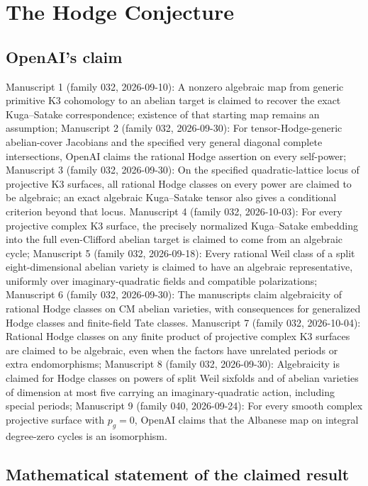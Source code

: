 \documentclass[11pt]{article}
\begin{document}
\section*{The Hodge Conjecture}

\subsection{OpenAI's claim}
Manuscript 1 (family 032, 2026-09-10): A nonzero algebraic map from generic primitive K3 cohomology to an abelian target is claimed to recover the exact Kuga--Satake correspondence; existence of that starting map remains an assumption; Manuscript 2 (family 032, 2026-09-30): For tensor-Hodge-generic abelian-cover Jacobians and the specified very general diagonal complete intersections, OpenAI claims the rational Hodge assertion on every self-power; Manuscript 3 (family 032, 2026-09-30): On the specified quadratic-lattice locus of projective K3 surfaces, all rational Hodge classes on every power are claimed to be algebraic; an exact algebraic Kuga--Satake tensor also gives a conditional criterion beyond that locus. Manuscript 4 (family 032, 2026-10-03): For every projective complex K3 surface, the precisely normalized Kuga--Satake embedding into the full even-Clifford abelian target is claimed to come from an algebraic cycle; Manuscript 5 (family 032, 2026-09-18): Every rational Weil class of a split eight-dimensional abelian variety is claimed to have an algebraic representative, uniformly over imaginary-quadratic fields and compatible polarizations; Manuscript 6 (family 032, 2026-09-30): The manuscripts claim algebraicity of rational Hodge classes on CM abelian varieties, with consequences for generalized Hodge classes and finite-field Tate classes. Manuscript 7 (family 032, 2026-10-04): Rational Hodge classes on any finite product of projective complex K3 surfaces are claimed to be algebraic, even when the factors have unrelated periods or extra endomorphisms; Manuscript 8 (family 032, 2026-09-30): Algebraicity is claimed for Hodge classes on powers of split Weil sixfolds and of abelian varieties of dimension at most five carrying an imaginary-quadratic action, including special periods; Manuscript 9 (family 040, 2026-09-24): For every smooth complex projective surface with $p_g=0$, OpenAI claims that the Albanese map on integral degree-zero cycles is an isomorphism.

\subsection{Mathematical statement of the claimed result}
\end{document}
